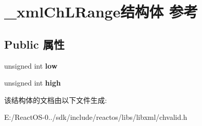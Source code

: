 \hypertarget{struct__xml_ch_l_range}{}\section{\+\_\+xml\+Ch\+L\+Range结构体 参考}
\label{struct__xml_ch_l_range}
\subsection*{Public 属性}
\begin{DoxyCompactItemize}
\item 
\mbox{\label{struct__xml_ch_l_range_a800f5f23caaf4e69f2db471e198128b8}} 
unsigned int {\bfseries low}
\item 
\mbox{\label{struct__xml_ch_l_range_aae73630963e58384bec6d57ede374132}} 
unsigned int {\bfseries high}
\end{DoxyCompactItemize}


该结构体的文档由以下文件生成\+:\begin{DoxyCompactItemize}
\item 
E\+:/\+React\+O\+S-\/0../sdk/include/reactos/libs/libxml/chvalid.\+h\end{DoxyCompactItemize}
